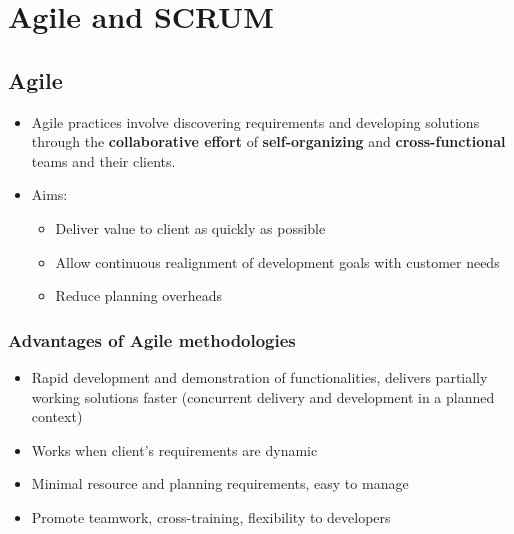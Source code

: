 \documentclass{article}
\begin{document}
\section{Agile and SCRUM}
\subsection{Agile}
\begin{itemize}
    \item Agile practices involve discovering requirements and developing solutions through the \textbf{collaborative effort} of \textbf{self-organizing} and \textbf{cross-functional} teams and their clients. 
    
    \item Aims:
    \begin{itemize}
    
        \item Deliver value to client as quickly as possible
        
        \item Allow continuous realignment of development goals with customer needs
        
        \item Reduce planning overheads
    \end{itemize}
\end{itemize}

\subsubsection{Advantages of Agile methodologies}
\begin{itemize}
    \item Rapid development and demonstration of functionalities, delivers partially working solutions faster (concurrent delivery and development in a planned context)
    
    \item Works when client's requirements are dynamic
    
    \item Minimal resource and planning requirements, easy to manage
    
    \item Promote teamwork, cross-training, flexibility to developers
\end{itemize}
\end{document}
